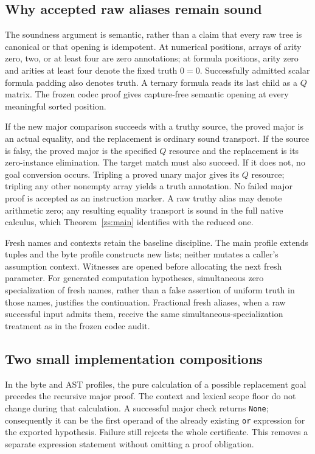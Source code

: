 \documentclass[11pt]{article}
\theoremstyle{definition}\newtheorem{definition}[theorem]{Definition}
\theoremstyle{remark}\newtheorem{remark}[theorem]{Remark}
\newcommand{\file}[1]{\texttt{#1}}
\begin{document}
\subsection{Why accepted raw aliases remain sound}

The soundness argument is semantic, rather than a claim that every raw tree
is canonical or that opening is idempotent. At numerical positions, arrays of arity zero, two, or at least four
are zero annotations; at formula positions, arity zero and arities
at least four denote the fixed truth $0=0$. Successfully admitted scalar
formula padding also denotes truth. A ternary formula reads its last child
as a $Q$ matrix. The frozen codec proof gives capture-free semantic opening
at every meaningful sorted position.

If the new major comparison succeeds with a truthy source, the proved
major is an actual equality, and the replacement is ordinary sound
transport. If the source is falsy, the proved major is the specified $Q$
resource and the replacement is its zero-instance elimination. The target
match must also succeed. If it does not, no goal conversion occurs.
Tripling a proved unary major gives its $Q$ resource; tripling any other
nonempty array yields a truth annotation. No failed major proof is accepted
as an instruction marker. A raw truthy alias may denote arithmetic zero;
any resulting equality transport is sound in the full native calculus,
which Theorem~\ref{zs:main} identifies with the reduced one.

Fresh names and contexts retain the baseline discipline. The main profile
extends tuples and the byte profile constructs new lists; neither mutates
a caller's assumption context. Witnesses are opened before allocating the
next fresh parameter. For generated computation hypotheses, simultaneous
zero specialization of fresh names, rather than a false assertion of
uniform truth in those names, justifies the continuation. Fractional fresh
aliases, when a raw successful input admits them, receive the same
simultaneous-specialization treatment as in the frozen codec audit.

\subsection{Two small implementation compositions}

In the byte and AST profiles, the pure calculation of a possible replacement
goal precedes the recursive major proof. The context and lexical scope
floor do not change during that calculation. A successful major check
returns \file{None}; consequently it can be the first operand of the
already existing \file{or} expression for the exported hypothesis. Failure
still rejects the whole certificate. This removes a separate expression
statement without omitting a proof obligation.
\end{document}

